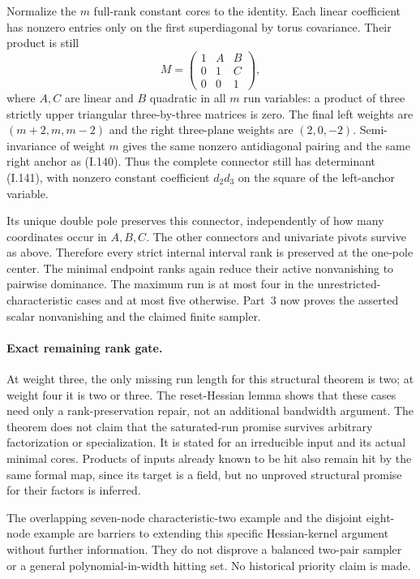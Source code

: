 Normalize the $m$ full-rank constant cores to the identity.
Each linear coefficient has nonzero entries only on the first
superdiagonal by torus covariance. Their product is still
\[
 M=\begin{pmatrix}1&A&B\\0&1&C\\0&0&1\end{pmatrix},
 \tag{I42.9}
\]
where $A,C$ are linear and $B$ quadratic in all $m$ run
variables: a product of three strictly upper triangular
three-by-three matrices is zero. The final left weights are
$(m+2,m,m-2)$ and the right three-plane weights are
$(2,0,-2)$. Semi-invariance of weight $m$ gives the same
nonzero antidiagonal pairing and the same right anchor
as (I.140). Thus the complete connector still has determinant
(I.141), with nonzero constant coefficient $d_2d_3$ on the
square of the left-anchor variable.

Its unique double pole preserves this connector, independently
of how many coordinates occur in $A,B,C$. The other connectors
and univariate pivots survive as above. Therefore every strict
internal interval rank is preserved at the one-pole center.
The minimal endpoint ranks again reduce their active
nonvanishing to pairwise dominance. The maximum run is at
most four in the unrestricted-characteristic cases and at
most five otherwise. Part~3 now proves the asserted scalar
nonvanishing and the claimed finite sampler.

\paragraph{Exact remaining rank gate.}
At weight three, the only missing run length for this
structural theorem is two; at weight four it is two or three.
The reset-Hessian lemma shows that these cases need only a
rank-preservation repair, not an additional bandwidth argument.
The theorem does not claim that the saturated-run promise
survives arbitrary factorization or specialization. It is
stated for an irreducible input and its actual minimal cores.
Products of inputs already known to be hit also remain hit
by the same formal map, since its target is a field, but no
unproved structural promise for their factors is inferred.

The overlapping seven-node characteristic-two example and the
disjoint eight-node example are barriers to extending this
specific Hessian-kernel argument without further information.
They do not disprove a balanced two-pair sampler or a general
polynomial-in-width hitting set. No historical priority claim
is made.
